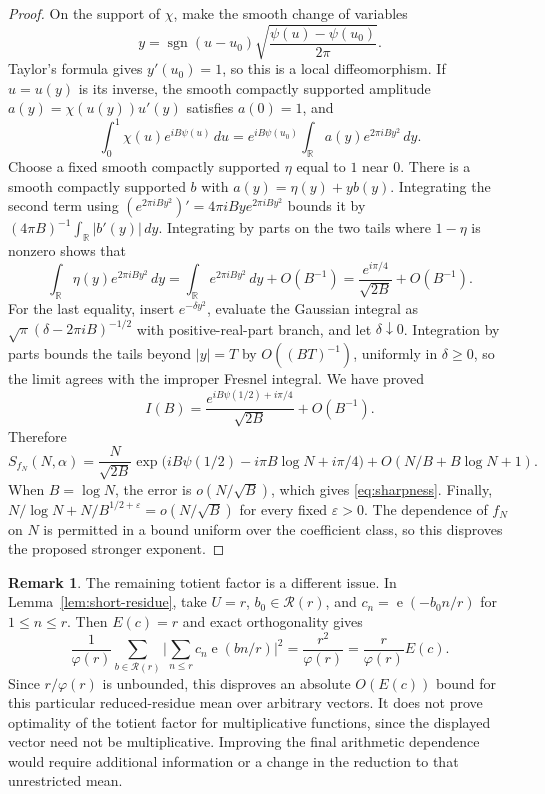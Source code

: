 \documentclass[11pt]{amsart}
\numberwithin{equation}{section}
\numberwithin{figure}{section}
\theoremstyle{definition}
\newtheorem{remark}{Remark}[section]
\newcommand{\R}{\mathbb{R}}
\newcommand{\e}{\operatorname{e}}
\newcommand{\eps}{\varepsilon}
\begin{document}
\begin{proof}
On the support of $\chi$, make the smooth change of variables
\[
 y=\operatorname{sgn}(u-u_0)
       \sqrt{\frac{\psi(u)-\psi(u_0)}{2\pi}}.
\]
Taylor's formula gives $y'(u_0)=1$, so this is a local diffeomorphism.
If $u=u(y)$ is its inverse, the smooth compactly supported amplitude
$a(y)=\chi(u(y))u'(y)$ satisfies $a(0)=1$, and
\[
 \int_0^1\chi(u)e^{iB\psi(u)}\,du
 =e^{iB\psi(u_0)}\int_{\R}a(y)e^{2\pi iBy^2}\,dy.
\]
Choose a fixed smooth compactly supported $\eta$ equal to $1$ near
$0$. There is a smooth compactly supported $b$ with
$a(y)=\eta(y)+yb(y)$. Integrating the second term using
$(e^{2\pi iBy^2})'=4\pi iBy e^{2\pi iBy^2}$ bounds it by
$(4\pi B)^{-1}\int_{\R}|b'(y)|\,dy$. Integrating by parts on the two tails where
$1-\eta$ is nonzero shows that
\[
 \int_{\R}\eta(y)e^{2\pi iBy^2}\,dy
 =\int_{\R}e^{2\pi iBy^2}\,dy+O(B^{-1})
 =\frac{e^{i\pi/4}}{\sqrt{2B}}+O(B^{-1}).
\]
For the last equality, insert $e^{-\delta y^2}$, evaluate the Gaussian
integral as $\sqrt\pi(\delta-2\pi iB)^{-1/2}$ with positive-real-part
branch, and let $\delta\downarrow0$. Integration by parts bounds the
tails beyond $|y|=T$ by $O((BT)^{-1})$, uniformly in $\delta\ge0$,
so the limit agrees with the improper Fresnel integral.
We have proved
\[
 I(B)=\frac{e^{iB\psi(1/2)+i\pi/4}}{\sqrt{2B}}+O(B^{-1}).
\]
Therefore
\begin{equation}\label{eq:sharpness-expansion}
 S_{f_N}(N,\alpha)
 =\frac{N}{\sqrt{2B}}
   \exp\bigl(iB\psi(1/2)-i\pi B\log N+i\pi/4\bigr)
 +O(N/B+B\log N+1).
\end{equation}
When $B=\log N$, the error is $o(N/\sqrt B)$, which gives
\eqref{eq:sharpness}.
Finally,
$N/\log N+N/B^{1/2+\eps}=o(N/\sqrt B)$ for every fixed
$\eps>0$. The dependence of $f_N$ on $N$ is permitted in a
bound uniform over the coefficient class, so this disproves the proposed
stronger exponent.
\end{proof}

\begin{remark}\label{rem:totient-obstruction}
The remaining totient factor is a different issue. In
Lemma~\ref{lem:short-residue}, take $U=r$, $b_0\in\mathcal R(r)$, and
$c_n=\e(-b_0n/r)$ for $1\le n\le r$. Then $E(c)=r$ and exact
orthogonality gives
\[
 \frac1{\varphi(r)}\sum_{b\in\mathcal R(r)}
       \bigg|\sum_{n\le r}c_n\e(bn/r)\bigg|^2
 =\frac{r^2}{\varphi(r)}=\frac r{\varphi(r)}E(c).
\]
Since $r/\varphi(r)$ is unbounded, this disproves an absolute
$O(E(c))$ bound for this particular reduced-residue mean over
arbitrary vectors. It does not prove
optimality of the totient factor for multiplicative functions,
since the displayed vector need not be multiplicative. Improving
the final arithmetic dependence would require additional
information or a change in the reduction to that unrestricted mean.
\end{remark}
\end{document}
